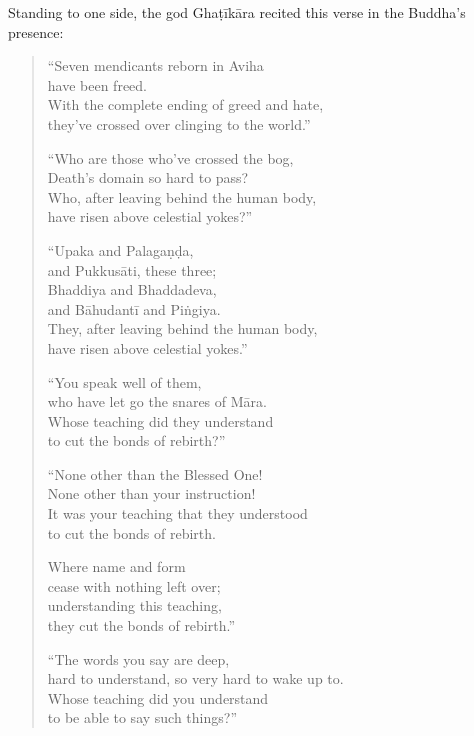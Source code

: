 \documentclass[12pt,openany]{book}%
\begin{document}
Standing to one side, the god \textsanskrit{Ghaṭīkāra} recited this verse in the Buddha’s presence: 

\begin{verse}%
“Seven mendicants reborn in Aviha \\
have been freed. \\
With the complete ending of greed and hate, \\
they’ve crossed over clinging to the world.” 

“Who are those who’ve crossed the bog, \\
Death’s domain so hard to pass? \\
Who, after leaving behind the human body, \\
have risen above celestial yokes?” 

“Upaka and \textsanskrit{Palagaṇḍa}, \\
and \textsanskrit{Pukkusāti}, these three; \\
Bhaddiya and Bhaddadeva, \\
and \textsanskrit{Bāhudantī} and \textsanskrit{Piṅgiya}. \\
They, after leaving behind the human body, \\
have risen above celestial yokes.” 

“You speak well of them, \\
who have let go the snares of \textsanskrit{Māra}. \\
Whose teaching did they understand \\
to cut the bonds of rebirth?” 

“None other than the Blessed One! \\
None other than your instruction! \\
It was your teaching that they understood \\
to cut the bonds of rebirth. 

Where name and form \\
cease with nothing left over; \\
understanding this teaching, \\
they cut the bonds of rebirth.” 

“The words you say are deep, \\
hard to understand, so very hard to wake up to. \\
Whose teaching did you understand \\
to be able to say such things?” 


\end{verse}
\end{document}
